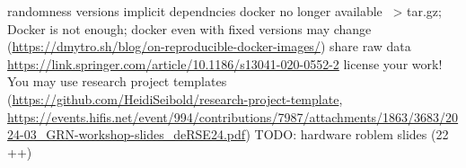 
\begin{frame}[fragile]
randomness
versions
implicit dependncies
docker  no longer available ~> tar.gz; Docker is not enough; docker even with fixed versions may change (\url{https://dmytro.sh/blog/on-reproducible-docker-images/})
share raw data \url{https://link.springer.com/article/10.1186/s13041-020-0552-2}
license your work!
You may use research project templates (\url{https://github.com/HeidiSeibold/research-project-template}, \url{https://events.hifis.net/event/994/contributions/7987/attachments/1863/3683/2024-03_GRN-workshop-slides_deRSE24.pdf})
TODO: hardware roblem slides (22 ++)
\end{frame}

